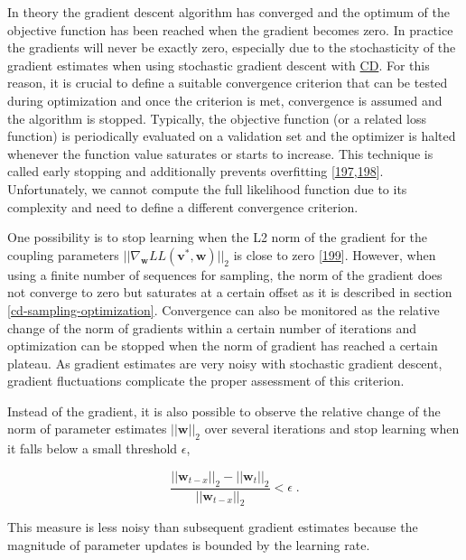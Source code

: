\documentclass[11pt,a4paper,twoside]{book}
\renewcommand{\v}{\mathbf{v}}
\newcommand{\w}{\mathbf{w}}
\theoremstyle{definition}
\theoremstyle{definition}
\theoremstyle{remark}
\begin{document}
In theory the gradient descent algorithm has converged and the optimum
of the objective function has been reached when the gradient becomes
zero. In practice the gradients will never be exactly zero, especially
due to the stochasticity of the gradient estimates when using stochastic
gradient descent with \protect\hyperlink{abbrev}{CD}. For this reason,
it is crucial to define a suitable convergence criterion that can be
tested during optimization and once the criterion is met, convergence is
assumed and the algorithm is stopped. Typically, the objective function
(or a related loss function) is periodically evaluated on a validation
set and the optimizer is halted whenever the function value saturates or
starts to increase. This technique is called early stopping and
additionally prevents overfitting
{[}\protect\hyperlink{ref-Bengio2012}{197},\protect\hyperlink{ref-Mahsereci2017}{198}{]}.
Unfortunately, we cannot compute the full likelihood function due to its
complexity and need to define a different convergence criterion.

One possibility is to stop learning when the L2 norm of the gradient for
the coupling parameters \(||\nabla_{\w} L\!L(\v^*, \w)||_2\) is close to
zero {[}\protect\hyperlink{ref-Carreira-Perpinan2005}{199}{]}. However,
when using a finite number of sequences for sampling, the norm of the
gradient does not converge to zero but saturates at a certain offset as
it is described in section \ref{cd-sampling-optimization}. Convergence
can also be monitored as the relative change of the norm of gradients
within a certain number of iterations and optimization can be stopped
when the norm of gradient has reached a certain plateau. As gradient
estimates are very noisy with stochastic gradient descent, gradient
fluctuations complicate the proper assessment of this criterion.

Instead of the gradient, it is also possible to observe the relative
change of the norm of parameter estimates \(||\w||_2\) over several
iterations and stop learning when it falls below a small threshold
\(\epsilon\),

\begin{equation}
  \frac{||\w_{t-x}||_2 - ||\w_t||_2}{||\w_{t-x}||_2} < \epsilon \; .
  \label{eq:parameter-convergence-criterion}
\end{equation}

This measure is less noisy than subsequent gradient estimates because
the magnitude of parameter updates is bounded by the learning rate.
\end{document}
